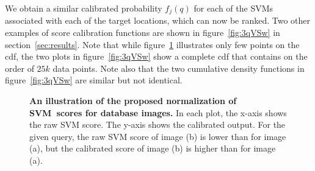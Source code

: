       We obtain a similar calibrated probability $f_j(q)$ for each of the SVMs associated with each of the target locations, which can now be ranked.
      Two other examples of score calibration functions are shown in figure~\ref{fig:3qVSw} in section~\ref{sec:results}. Note that while figure~\ref{fig:calib} illustrates only few points on the cdf, the two plots in figure~\ref{fig:3qVSw} show a complete cdf that contains on the order of $25k$ data points. Note also that the two cumulative density functions in figure~\ref{fig:3qVSw} are similar but not identical.
      \begin{figure}[]
         \vspace{1mm}
         \vspace{1.5mm}\newline
         \vspace*{-3mm}
         \caption[]{
            \textbf{An illustration of the proposed normalization of SVM~scores for database images.}
            In each plot, the x-axis shows the raw SVM score. The y-axis shows the calibrated output. For the given query, the raw SVM score of image (b) is lower than for image (a), but the calibrated score of image (b) is higher than for image (a). 
         }
         \vspace*{-2mm}
         \label{fig:calib}
      \end{figure}
